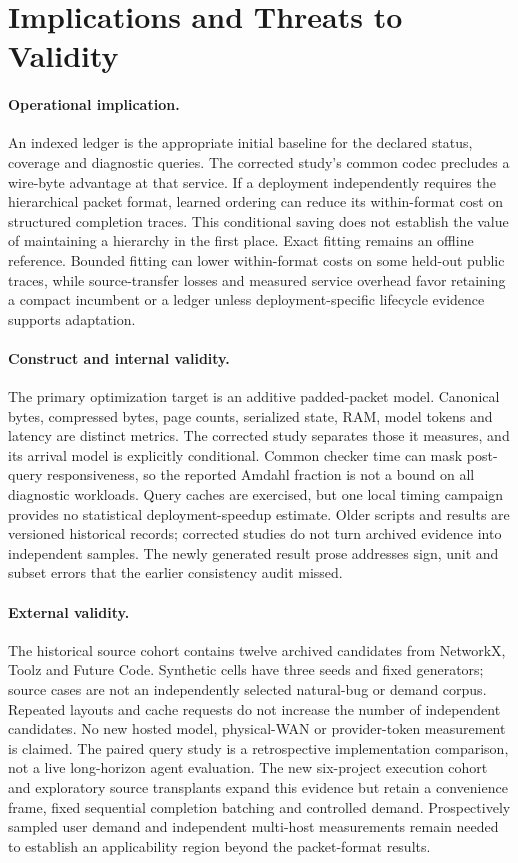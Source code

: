 \section{Implications and Threats to Validity}\label{sec:threats}
\paragraph{Operational implication.}
An indexed ledger is the appropriate initial baseline for the declared
status, coverage and diagnostic queries. The corrected study's common codec
precludes a wire-byte advantage at that service. If a deployment independently
requires the hierarchical packet format, learned ordering can reduce its
within-format cost on structured completion traces. This conditional saving
does not establish the value of maintaining a hierarchy in the first place.
Exact fitting remains an offline reference. Bounded fitting can lower
within-format costs on some held-out public traces, while source-transfer
losses and measured service overhead favor retaining a compact incumbent or
a ledger unless deployment-specific lifecycle evidence supports adaptation.

\paragraph{Construct and internal validity.}
The primary optimization target is an additive padded-packet model. Canonical
bytes, compressed bytes, page counts, serialized state, RAM, model tokens and
latency are distinct metrics. The corrected study separates those it measures,
and its arrival model is explicitly conditional. Common checker time can mask
post-query responsiveness, so the reported Amdahl fraction is not a bound on
all diagnostic workloads. Query caches are exercised, but one local timing
campaign provides no statistical deployment-speedup estimate. Older scripts
and results are versioned historical records; corrected studies do not turn
archived evidence into independent samples. The newly generated result prose
addresses sign, unit and subset errors that the earlier consistency audit missed.

\paragraph{External validity.}
The historical source cohort contains twelve archived candidates from NetworkX, Toolz
and Future Code. Synthetic cells have three seeds and fixed generators;
source cases are not an independently selected natural-bug or demand corpus.
Repeated layouts and cache requests do not increase the number of independent
candidates. No new hosted model, physical-WAN or provider-token measurement is
claimed. The paired query study is a retrospective implementation comparison,
not a live long-horizon agent evaluation. The new six-project execution cohort and exploratory source transplants
expand this evidence but retain a convenience frame, fixed sequential
completion batching and controlled demand. Prospectively sampled user demand
and independent multi-host measurements remain needed
to establish an applicability region beyond the packet-format results.

